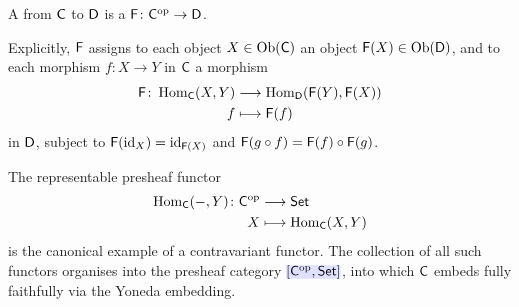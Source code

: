 \documentclass[../preamble]{subfiles}
\begin{document}
\begin{definition}
  \label{def:contravariant-functor}
  A  from $\mathsf{C}$ to $\mathsf{D}$
  is a 
  $\Functor{F} \colon \Category{C}^{\mathrm{op}} \lto \Category{D}$.

  Explicitly, $\mathsf{F}$ assigns to each object $X \in \operatorname{Ob}(\mathsf{C})$
  an object $\mathsf{F}(X) \in \operatorname{Ob}(\mathsf{D})$,
  and to each morphism $f \colon X \to Y$ in $\mathsf{C}$
  a morphism
  \begin{equation}
    \label{eq:contravariant-hom}
    \begin{aligned}
      \Functor{F} \colon \Hom_{\Category{C}}(X, Y)
        &\lto \Hom_{\Category{D}}(\Functor{F}(Y), \Functor{F}(X)) \\
      f &\lmapsto \Functor{F}(f)
    \end{aligned}
  \end{equation}
  in $\mathsf{D}$,
  subject to $\mathsf{F}(\operatorname{id}_X) = \operatorname{id}_{\mathsf{F}(X)}$
  and $\mathsf{F}(g \circ f) = \mathsf{F}(f) \circ \mathsf{F}(g)$.
\end{definition}

\begin{remark}
  The representable presheaf functor
  \begin{equation}
    \begin{aligned}
      \Hom_{\Category{C}}(-, Y) \colon \Category{C}^{\mathrm{op}}
        &\lto \Set \\
      X &\lmapsto \Hom_{\Category{C}}(X, Y)
    \end{aligned}
  \end{equation}
  is the canonical example of a contravariant functor.
  The collection of all such functors organises into the presheaf category
  $\newmath{[\Category{C}^{\mathrm{op}}, \Set]}$,
  into which $\mathsf{C}$ embeds fully faithfully
  via the Yoneda embedding.
\end{remark}
\end{document}
